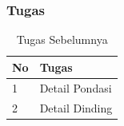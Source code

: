 \documentclass[../main.tex]{subfiles}
\begin{document}
\begin{frame}[mytitle=standard,t,mycolor=digiPH_creamy,dark]
	\frametitle{Tugas}
	\begin{table}[htb]
		\caption{Tugas Sebelumnya}
		\begin{tabularx}{\textwidth}{|p{1cm}|X|}
			\hline
			\textbf{No} & \textbf{Tugas} \\ \hline
			1           & Detail Pondasi \\ \hline
			2           & Detail Dinding \\ \hline
		\end{tabularx}
	\end{table}
\end{frame}



\end{document}

